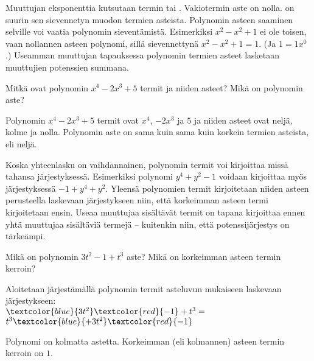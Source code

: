 Muuttujan eksponenttia kutsutaan termin  tai . Vakiotermin aste on nolla.  on suurin sen sievennetyn muodon termien asteista. Polynomin asteen saaminen selville voi vaatia polynomin sieventämistä. Esimerkiksi $x^2-x^2+1$ ei ole toisen, vaan nollannen asteen polynomi, sillä sievennettynä $x^2-x^2+1=1$. (Ja $1=1x^0$.) Useamman muuttujan tapauksessa polynomin termien asteet lasketaan muuttujien potenssien summana.

\begin{esimerkki}
    Mitkä ovat polynomin $x^4-2x^3+5$ termit ja niiden asteet? Mikä on polynomin aste?
    \begin{esimvast}
        Polynomin $x^4-2x^3+5$ termit ovat $x^4$, $-2x^3$ ja $5$ ja niiden asteet ovat
        neljä, kolme ja nolla. Polynomin aste on sama kuin sama kuin
        korkein termien asteista, eli neljä.
    \end{esimvast}
\end{esimerkki}

Koska yhteenlasku on vaihdannainen, polynomin termit voi kirjoittaa missä tahansa järjestyksessä. Esimerkiksi polynomi $y^4+y^2-1$ voidaan kirjoittaa myös järjestyksessä $-1+y^4+y^2$. Yleensä polynomien termit kirjoitetaan niiden asteen perusteella laskevaan järjestykseen niin, että korkeimman asteen termi kirjoitetaan ensin. Useaa muuttujaa sisältävät termit on tapana kirjoittaa ennen yhtä muuttujaa sisältäviä termejä – kuitenkin niin, että potenssijärjestys on tärkeämpi.

\begin{esimerkki}
	Mikä on polynomin $3t^2-1+t^3$ aste? Mikä on korkeimman asteen termin kerroin?
\begin{esimratk}
	
Aloitetaan järjestämällä polynomin termit asteluvun mukaiseen laskevaan järjestykseen: \\
	  $\textcolor{blue}{3t^2}\textcolor{red}{-1}+t^3=$ \\
	  $t^3\textcolor{blue}{+3t^2}\textcolor{red}{-1}$ \\
	
\end{esimratk}

\begin{esimvast}
Polynomi on kolmatta astetta. Korkeimman (eli kolmannen) asteen termin kerroin on $1$.
\end{esimvast}

\end{esimerkki}

